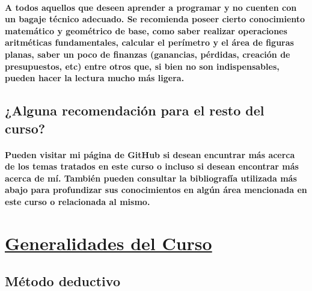 \documentclass[a4paper, 12pt]{article}
\begin{document}
    \paragraph{
        A todos aquellos que deseen aprender a programar y no cuenten con un bagaje técnico adecuado. Se recomienda poseer cierto conocimiento 
        matemático y geométrico de base, como saber realizar operaciones aritméticas fundamentales, calcular el perímetro y el área de 
        figuras planas, saber un poco de finanzas (ganancias, pérdidas, creación de presupuestos, etc) entre otros que, si bien no son 
        indispensables, pueden hacer la lectura mucho más ligera.
    }
    \subsection*{\textbf{¿Alguna recomendación para el resto del curso?}}
    \paragraph{
        Pueden visitar mi página de GitHub si desean encuntrar más acerca de los temas tratados en este curso o incluso si desean encontrar 
        más acerca de mí. También pueden consultar la bibliografía utilizada más abajo para profundizar sus conocimientos en algún 
        área mencionada en este curso o relacionada al mismo.
    }
    \newpage\section*{\textbf{\underline{Generalidades del Curso}}}
    \subsection*{\textbf{Método deductivo}}
\end{document}
